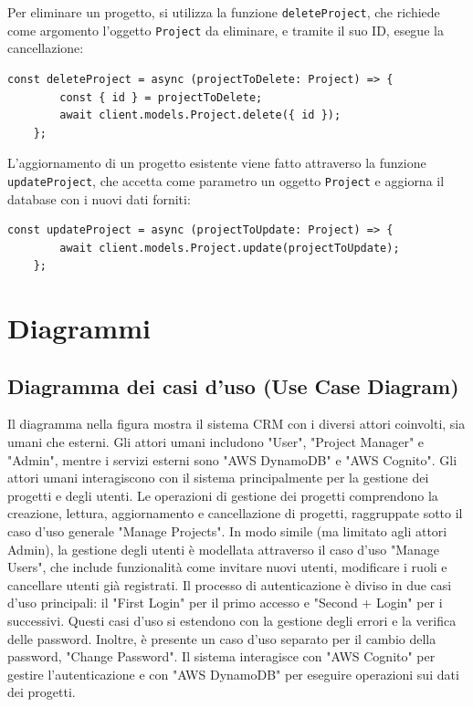 \documentclass[target=bach,aauheader=,style=]{thud}
\begin{document}
\noindent Per eliminare un progetto, si utilizza la funzione \texttt{deleteProject}, che richiede come argomento l'oggetto \texttt{Project} da eliminare, e tramite il suo ID, esegue la cancellazione:

\begin{lstlisting}[caption=funzione \texttt{deleteProject}]
    const deleteProject = async (projectToDelete: Project) => {
        const { id } = projectToDelete;
        await client.models.Project.delete({ id });
    };
\end{lstlisting}

\noindent L'aggiornamento di un progetto esistente viene fatto  attraverso la funzione \texttt{updateProject}, che accetta come parametro un oggetto \texttt{Project} e aggiorna il database con i nuovi dati forniti:

\begin{lstlisting}[caption=funzione \texttt{updateProject}]
    const updateProject = async (projectToUpdate: Project) => {
        await client.models.Project.update(projectToUpdate);
    };
\end{lstlisting}

\section{Diagrammi}
\subsection{Diagramma dei casi d'uso (Use Case Diagram)}
Il diagramma nella figura mostra il sistema CRM con i diversi attori coinvolti, sia umani che esterni. Gli attori umani includono "User", "Project Manager" e "Admin", mentre i servizi esterni sono "AWS DynamoDB" e "AWS Cognito". Gli attori umani interagiscono con il sistema principalmente per la gestione dei progetti e degli utenti. Le operazioni di gestione dei progetti comprendono la creazione, lettura, aggiornamento e cancellazione di progetti, raggruppate sotto il caso d'uso generale "Manage Projects". In modo simile (ma limitato agli attori Admin), la gestione degli utenti è modellata attraverso il caso d'uso "Manage Users", che include funzionalità come invitare nuovi utenti, modificare i ruoli e cancellare utenti già registrati. Il processo di autenticazione è diviso in due casi d'uso principali: il "First Login" per il primo accesso e "Second + Login" per i successivi. Questi casi d'uso si estendono con la gestione degli errori e la verifica delle password. Inoltre, è presente un caso d'uso separato per il cambio della password, "Change Password". Il sistema interagisce con "AWS Cognito" per gestire l'autenticazione e con "AWS DynamoDB" per eseguire operazioni sui dati dei progetti.
\end{document}
